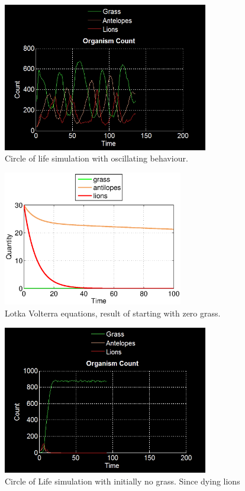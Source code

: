 \documentclass[11pt]{article}
\begin{document}
\begin{figure}
\centering
\includegraphics[width=0.8\textwidth]{circleOfLifeOscillating.png}
\caption{Circle of life simulation with oscillating behaviour.}
\label{fig:noGrass}
\end{figure}

\begin{figure}[p]
\centering
\includegraphics[width=0.7\textwidth]{LotkaVolterraNoGrass.eps}
\caption{Lotka Volterra equations, result of starting with zero grass.}
\label{fig:removeAllGrass}
\end{figure}

\begin{figure}
\centering
\includegraphics[width=0.8\textwidth]{noGrassOnlyCount.png}
\caption{Circle of Life simulation with initially no grass. Since dying lions}
\label{fig:noGrass}
\end{figure}
\end{document}
